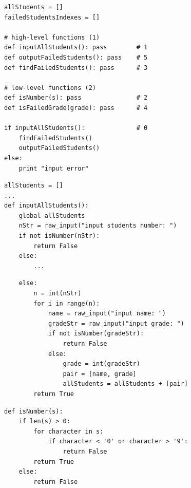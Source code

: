 {

\begin{frame}[fragile]
  \begin{verbatim}
allStudents = []
failedStudentsIndexes = []

# high-level functions (1)
def inputAllStudents(): pass        # 1
def outputFailedStudents(): pass    # 5
def findFailedStudents(): pass      # 3

# low-level functions (2)
def isNumber(s): pass               # 2
def isFailedGrade(grade): pass      # 4

if inputAllStudents():              # 0
    findFailedStudents()
    outputFailedStudents()
else:
    print "input error"
  \end{verbatim}
\end{frame}

\begin{frame}[fragile]
  \begin{verbatim}
allStudents = []
...
def inputAllStudents():
    global allStudents
    nStr = raw_input("input students number: ")
    if not isNumber(nStr):
        return False
    else:
        ...
  \end{verbatim}
\end{frame}

\begin{frame}[fragile]
  \begin{verbatim}
    else:
        n = int(nStr)
        for i in range(n):
            name = raw_input("input name: ")
            gradeStr = raw_input("input grade: ")
            if not isNumber(gradeStr):
                return False
            else:
                grade = int(gradeStr)
                pair = [name, grade]
                allStudents = allStudents + [pair]
        return True
  \end{verbatim}
\end{frame}

\begin{frame}[fragile]
  \begin{verbatim}
def isNumber(s):
    if len(s) > 0:
        for character in s:
            if character < '0' or character > '9':
                return False
        return True
    else:
        return False
  \end{verbatim}
\end{frame}

}

